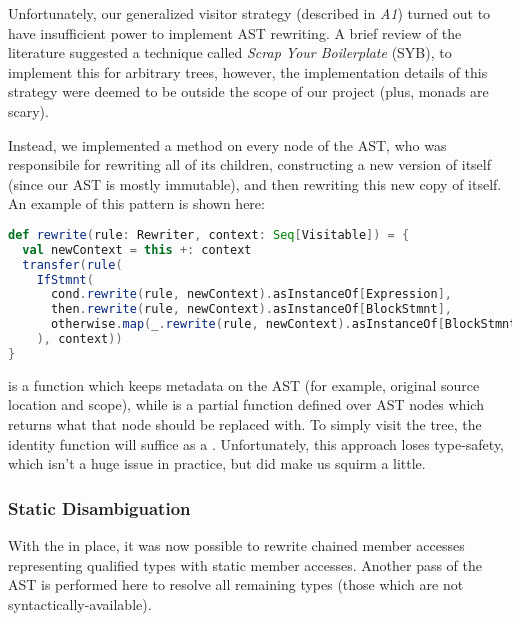 \documentclass{article}
\begin{document}
Unfortunately, our generalized visitor strategy (described in \textit{A1}) turned out to have insufficient power to
implement AST rewriting. A brief review of the literature suggested a technique called \textit{Scrap Your Boilerplate}
(SYB), to implement this for arbitrary trees, however, the implementation details of this strategy were deemed to be
outside the scope of our project (plus, monads are scary).

Instead, we implemented a  method on every node of the AST, who was responsibile for rewriting all of its
children, constructing a new version of itself (since our AST is mostly immutable), and then rewriting this new copy of
itself. An example of this pattern is shown here:

\begin{lstlisting}[language=Scala]
def rewrite(rule: Rewriter, context: Seq[Visitable]) = {
  val newContext = this +: context
  transfer(rule(
    IfStmnt(
      cond.rewrite(rule, newContext).asInstanceOf[Expression],
      then.rewrite(rule, newContext).asInstanceOf[BlockStmnt],
      otherwise.map(_.rewrite(rule, newContext).asInstanceOf[BlockStmnt])
    ), context))
}
\end{lstlisting}

 is a function which keeps metadata on the AST (for example, original source location and scope), while
 is a partial function defined over AST nodes which returns what that node should be replaced with. To simply
visit the tree, the identity function will suffice as a . Unfortunately, this approach loses type-safety,
which isn't a huge issue in practice, but did make us squirm a little.


\subsubsection{Static Disambiguation}
With the  in place, it was now possible to rewrite chained member accesses representing qualified
types with static member accesses. Another pass of the AST is performed here to resolve all remaining types (those which
are not syntactically-available).
\end{document}
